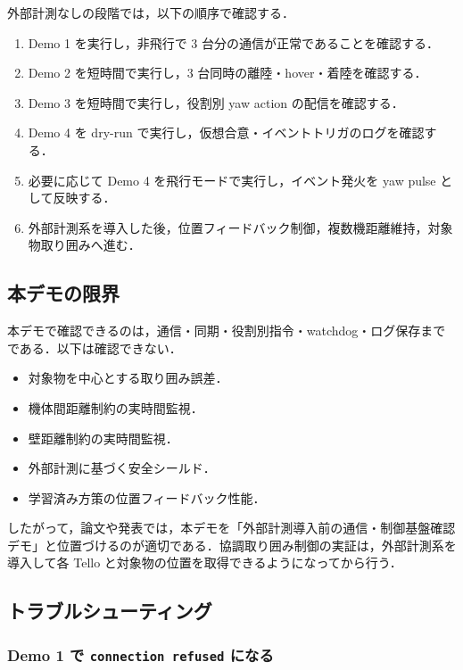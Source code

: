 外部計測なしの段階では，以下の順序で確認する．

\begin{enumerate}
  \item Demo 1 を実行し，非飛行で 3 台分の通信が正常であることを確認する．
  \item Demo 2 を短時間で実行し，3 台同時の離陸・hover・着陸を確認する．
  \item Demo 3 を短時間で実行し，役割別 yaw action の配信を確認する．
  \item Demo 4 を dry-run で実行し，仮想合意・イベントトリガのログを確認する．
  \item 必要に応じて Demo 4 を飛行モードで実行し，イベント発火を yaw pulse として反映する．
  \item 外部計測系を導入した後，位置フィードバック制御，複数機距離維持，対象物取り囲みへ進む．
\end{enumerate}

\subsection{本デモの限界}

本デモで確認できるのは，通信・同期・役割別指令・watchdog・ログ保存までである．以下は確認できない．

\begin{itemize}
  \item 対象物を中心とする取り囲み誤差．
  \item 機体間距離制約の実時間監視．
  \item 壁距離制約の実時間監視．
  \item 外部計測に基づく安全シールド．
  \item 学習済み方策の位置フィードバック性能．
\end{itemize}

したがって，論文や発表では，本デモを「外部計測導入前の通信・制御基盤確認デモ」と位置づけるのが適切である．協調取り囲み制御の実証は，外部計測系を導入して各 Tello と対象物の位置を取得できるようになってから行う．

\subsection{トラブルシューティング}

\subsubsection{Demo 1 で \texttt{connection refused} になる}

